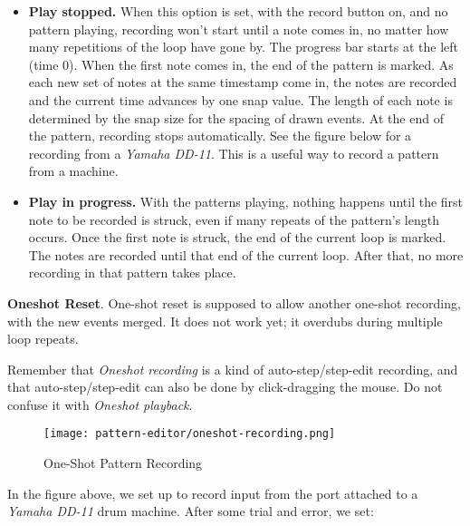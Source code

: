 \begin{enumber}
\begin{itemize}
            \item \textbf{Play stopped.}
               When this option is set, with the record button on, and no
               pattern playing, recording won't start until a note comes in,
               no matter how many repetitions of the loop have gone by.  The
               progress bar starts at the left (time 0).  When the first
               note comes in, the end of the pattern is marked.  As each new
               set of notes at the same timestamp come in, the notes are
               recorded and the current time advances by one snap value.
               The length of each note is determined by the snap size for
               the spacing of drawn events.  At the end of the pattern,
               recording stops automatically.  See the figure below for a
               recording from a \textsl{Yamaha DD-11}.  This is a useful way
               to record a pattern from a machine.
            \item \textbf{Play in progress.}
               With the patterns playing, nothing happens until the first
               note to be recorded is struck, even if many repeats of the
               pattern's length occurs.
               Once the first note is struck, the end of the current loop
               is marked.
               The notes are recorded until that end of the current loop.
               After that, no more recording in that pattern takes place.
         \end{itemize}
      \item \textbf{Oneshot Reset}.
               One-shot reset is supposed to allow another one-shot
               recording, with the new events merged.
               It does not work yet; it overdubs during multiple loop
               repeats.
   \end{enumber}

   Remember that \textsl{Oneshot recording} is a kind of auto-step/step-edit
   recording, and that auto-step/step-edit can also be done by click-dragging
   the mouse.  Do not confuse it with \textsl{Oneshot playback}.

\begin{figure}[H]
   \centering 
   \texttt{[image: pattern-editor/oneshot-recording.png]}
   \caption{One-Shot Pattern Recording}
   \label{fig:pattern_editor_oneshot_recording}
\end{figure}

   In the figure above, we set up to record input from the port attached to a
   \textsl{Yamaha DD-11} drum machine.  After some trial and error,
   we set:

